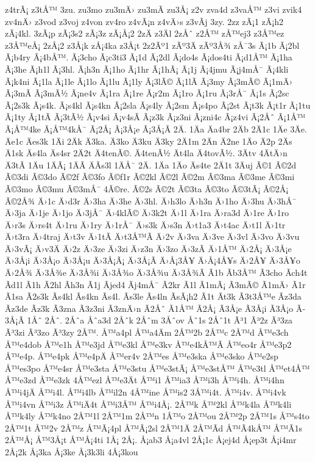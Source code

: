 {z4trÃ¡
z3tÅ™
3zu.
zu3mo
zu3mÄ›
zu3mÃ­
zu3Å¡
z2v
zva4d
z3vaÅ™
z3vi
zvik4
zv4nÄ›
z3vod
z3voj
z4von
zv4ro
z4vÃ¡n
z4vÄ›s
z3vÃ­j
3zy.
2zz
zÃ¡1
zÃ¡h2
zÃ¡4kl.
3zÃ¡p
zÃ¡3s2
zÃ¡3z
zÃ¡Å¡2
2zÄ
z3Äl
2zÅˆ
z2Å™
zÅ™ej3
z3Å™ez
z3Å™eÅ¡
2zÅ¡2
z3Å¡k
zÅ¡4ka
z3Å¡t
2z2Ãº1
zÃº3Ä
zÃº3Å¾
zÅ¯3s
Ã¡1b
Ã¡2bl
Ã¡b4ry
Ã¡4bÅ™.
Ã¡3cho
Ã¡c3ti3
Ã¡1d
Ã¡2dl
Ã¡do4s
Ã¡dos4ti
Ã¡d1Å™
Ã¡1ha
Ã¡3he
Ã¡h1l
Ã¡3hl.
Ã¡h3n
Ã¡1ho
Ã¡1hr
Ã¡1hÃ¡
Ã¡1j
Ã¡4jmu
Ã¡j4mÅ¯
Ã¡4kli
Ã¡k4ni
Ã¡1la
Ã¡1le
Ã¡1lo
Ã¡1lu
Ã¡1ly
Ã¡3lÃ©
Ã¡1lÃ­
Ã¡3my
Ã¡3mÃ©
Ã¡1mÄ›
Ã¡3mÃ­
Ã¡3mÃ½
Ã¡ne4v
Ã¡1ra
Ã¡1re
Ã¡r2m
Ã¡1ro
Ã¡1ru
Ã¡3rÅ¯
Ã¡1s
Ã¡2sc
Ã¡2s3k
Ã¡s4k.
Ã¡s4kl
Ã¡s4kn
Ã¡2sla
Ã¡s4ly
Ã¡2sm
Ã¡s4po
Ã¡2st
Ã¡t3k
Ã¡t1r
Ã¡1tu
Ã¡1ty
Ã¡1tÃ­
Ã¡3tÃ½
Ã¡v4si
Ã¡v4sÃ­
Ã¡z3k
Ã¡z3ni
Ã¡zni4c
Ã¡z4vi
Ã¡2Åˆ
Ã¡1Å™
Ã¡Å™4ke
Ã¡Å™4kÅ¯
Ã¡2Å¡
Ã¡3Å¡e
Ã¡3Å¡Ã­
2Ä.
1Äa
Äa4br
2Äb
2Ä1c
1Äe
3Äe.
Äe1c
Äes3k
1Äi
2Äk
Ä3ka.
Ä3ko
Ä3ku
Ä3ky
2Ä1m
2Än
Ä2ne
1Äo
Ä2p
2Äs
Ä1sk
Äs4la
Äs4sr
2Ä2t
Ä4tenÃ©.
Ä4tenÃ½
Ät4la
Ä4tovÃ½.
3Ätv
4ÄtÄ›n
Ä3tÃ­
1Äu
1ÄÃ¡
1ÄÃ­
ÄÃ­s3l
1ÄÅ¯
2Ä.
1Äa
1Äo
Äs4te
2Ä1t
3Äuj
Ã©1
Ã©2d
Ã©3di
Ã©3do
Ã©2f
Ã©3fo
Ã©f1r
Ã©2kl
Ã©2l
Ã©2m
Ã©3ma
Ã©3me
Ã©3mi
Ã©3mo
Ã©3mu
Ã©3mÅ¯
4Ã©re.
Ã©2s
Ã©2t
Ã©3ta
Ã©3to
Ã©3tÃ¡
Ã©2Å¡
Ã©2Å¾
Ä›1c
Ä›d3r
Ä›3ha
Ä›3he
Ä›3hl.
Ä›h3lo
Ä›h3n
Ä›1ho
Ä›3hu
Ä›3hÅ¯
Ä›3ja
Ä›1je
Ä›1jo
Ä›3jÅ¯
Ä›4klÃ©
Ä›3k2t
Ä›1l
Ä›1ra
Ä›ra3d
Ä›1re
Ä›1ro
Ä›r3s
Ä›rs4t
Ä›1ru
Ä›1ry
Ä›1rÅ¯
Ä›s3k
Ä›s3n
Ä›t1a3
Ä›t4ac
Ä›t1l
Ä›1tr
Ä›t3ra
Ä›4traj
Ä›t3v
Ä›1tÃ­
Ä›t3Å™Ã­
Ä›2v
Ä›3va
Ä›3ve
Ä›3vl
Ä›3vo
Ä›3vu
Ä›3vÃ¡
Ä›v3Ä
Ä›2z
Ä›3ze
Ä›3zi
Ä›z3n
Ä›3zo
Ä›3zÃ­
Ä›1Å™
Ä›2Å¡
Ä›3Å¡e
Ä›3Å¡i
Ä›3Å¡o
Ä›3Å¡u
Ä›3Å¡Ã¡
Ä›3Å¡Ã­
Ä›Å¡3Å¥
Ä›Å¡4Å¥s
Ä›2Å¥
Ä›3Å¥o
Ä›2Å¾
Ä›3Å¾e
Ä›3Å¾i
Ä›3Å¾o
Ä›3Å¾u
Ä›3Å¾Ã­
Ã­1b
Ã­b3Å™
Ã­3cho
Ã­ch4t
Ã­d1l
Ã­1h
Ã­2hl
Ã­h3n
Ã­1j
Ã­jed4
Ã­j4mÅ¯
Ã­2kr
Ã­1l
Ã­1mÃ¡
Ã­3mÃ©
Ã­1mÄ›
Ã­1r
Ã­1sa
Ã­2s3k
Ã­s4kl
Ã­s4kn
Ã­s4l.
Ã­s3le
Ã­s4ln
Ã­sÃ¡h2
Ã­1t
Ã­t3k
Ã­3t3Å™e
Ã­z3da
Ã­z3de
Ã­z3k
Ã­3zna
Ã­3z3ni
Ã­3znÄ›n
Ã­2Åˆ
Ã­1Å™
Ã­2Å¡
Ã­3Å¡e
Ã­3Å¡i
Ã­3Å¡o
Ã­3Å¡Ã­
1Åˆ
2Åˆ.
2Åˆa
Åˆa3d
2Åˆk
2Åˆm
3Åˆov
Åˆ1s
2Åˆ1t
Ã³1
Ã³2z
Ã³3za
Ã³3zi
Ã³3zo
Ã³3zy
2Å™.
Å™a4pl
Å™a4Äm
2Å™2b
2Å™c
2Å™d
Å™e3ch
Å™e4dob
Å™e1h
Å™e3jd
Å™e3kl
Å™e3kv
Å™e4kÅ™Ã­
Å™eo4r
Å™e3p2
Å™e4p.
Å™e4pk
Å™e4pÄ
Å™er4v
2Å™es
Å™e3ska
Å™e3sko
Å™e2sp
Å™es3po
Å™e4sr
Å™e3sta
Å™e3stu
Å™e3stÃ¡
Å™e3stÅ™
Å™e3tl
Å™et4Å™
Å™e3zd
Å™e3zk
4Å™ezl
Å™e3Ät
Å™i1
Å™ia3
Å™i3h
Å™i4h.
Å™i4hn
Å™i4jÄ
Å™i4l.
Å™i4lb
Å™il2n
4Å™ine
Å™is2
3Å™i4t.
Å™i4v.
Å™i4vk
Å™i4vn
Å™i3z
Å™iÄ4t
Å™i3Å™
Å™i4Å¡.
2Å™k
Å™2kl
Å™k4la
Å™k4li
Å™k4ly
Å™k4no
2Å™1l
2Å™1m
2Å™n
1Å™o
2Å™ou
2Å™2p
2Å™1s
Å™s4to
2Å™1t
Å™2v
2Å™z
Å™Ã¡4pl
Å™Ã¡2sl
2Å™1Ä
2Å™Ã­d
Å™Ã­4kÅ™
Å™Ã­1s
2Å™Å¡
Å™3Å¡t
Å™Å¡4ti
1Å¡
2Å¡.
Å¡ab3
Å¡a4vl
2Å¡1c
Å¡ej4d
Å¡ep3t
Å¡i4mr
2Å¡2k
Å¡3ka
Å¡3ke
Å¡3k3li
4Å¡3kou
}
